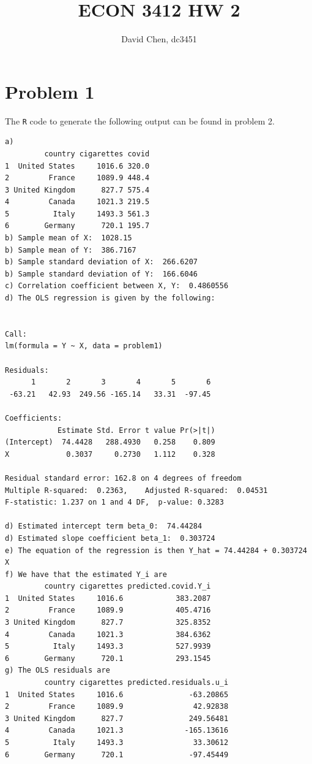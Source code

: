 \documentclass[12pt,letterpaper]{article}
\title{ECON 3412 HW 2}
\author{David Chen, dc3451}
\theoremstyle{definition}
\begin{document}
\maketitle

\section*{Problem 1}

The \verb|R| code to generate the following output can be found in problem 2.

\begin{Verbatim}[fontsize=\small]
a)
         country cigarettes covid
1  United States     1016.6 320.0
2         France     1089.9 448.4
3 United Kingdom      827.7 575.4
4         Canada     1021.3 219.5
5          Italy     1493.3 561.3
6        Germany      720.1 195.7
b) Sample mean of X:  1028.15
b) Sample mean of Y:  386.7167
b) Sample standard deviation of X:  266.6207
b) Sample standard deviation of Y:  166.6046
c) Correlation coefficient between X, Y:  0.4860556
d) The OLS regression is given by the following:


Call:
lm(formula = Y ~ X, data = problem1)

Residuals:
      1       2       3       4       5       6
 -63.21   42.93  249.56 -165.14   33.31  -97.45

Coefficients:
            Estimate Std. Error t value Pr(>|t|)
(Intercept)  74.4428   288.4930   0.258    0.809
X             0.3037     0.2730   1.112    0.328

Residual standard error: 162.8 on 4 degrees of freedom
Multiple R-squared:  0.2363,	Adjusted R-squared:  0.04531
F-statistic: 1.237 on 1 and 4 DF,  p-value: 0.3283

d) Estimated intercept term beta_0:  74.44284
d) Estimated slope coefficient beta_1:  0.303724
e) The equation of the regression is then Y_hat = 74.44284 + 0.303724 X
f) We have that the estimated Y_i are
         country cigarettes predicted.covid.Y_i
1  United States     1016.6            383.2087
2         France     1089.9            405.4716
3 United Kingdom      827.7            325.8352
4         Canada     1021.3            384.6362
5          Italy     1493.3            527.9939
6        Germany      720.1            293.1545
g) The OLS residuals are
         country cigarettes predicted.residuals.u_i
1  United States     1016.6               -63.20865
2         France     1089.9                42.92838
3 United Kingdom      827.7               249.56481
4         Canada     1021.3              -165.13616
5          Italy     1493.3                33.30612
6        Germany      720.1               -97.45449
\end{Verbatim}
\end{document}
